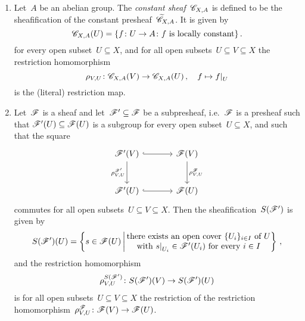 \begin{example}
\begin{enumerate}
      \begin{examplenonum}[Sheafificaton]
        \leavevmode
        \begin{enumerate}
          \item
            Let~$A$ be an abelian group.
            The \emph{constant sheaf}~$\mathscr{C}_{X,A}$ is defined to be the sheafification of the constant presheaf~$\widetilde{\mathscr{C}}_{X,A}$.
            It is given by
            \[
                \mathscr{C}_{X,A}(U)
              = \{
                  f \colon U \to A
                \colon
                  \text{$f$ is locally constant}
                \} \,.
            \]
            for every open subset~$U \subseteq X$, and for all open subsets~$U \subseteq V \subseteq X$ the restriction homomorphism
            \[
                      \rho_{V,U}
              \colon  \Cs_{X,A}(V)
              \to     \Cs_{X,A}(U) \,,
              \quad   f
              \mapsto \restrict{f}{U}
            \]
            is the (literal) restriction map.
          \item
            Let~$\mathscr{F}$ is a sheaf and let~$\mathscr{F}' \subseteq \mathscr{F}$ be a subpresheaf, i.e.~$\mathscr{F}$ is a presheaf such that $\mathscr{F}'(U) \subseteq \mathscr{F}(U)$ is a subgroup for every open subset~$U \subseteq X$, and such that the square
            \[
              \begin{tikzcd}[sep = large]
                  \Fs'(V)
                  \arrow[hook]{r}
                  \arrow{d}[left]{\rho^{\Fs'}_{V,U}}
                & \Fs(V)
                  \arrow{d}[right]{\rho^\Fs_{V,U}}
                \\
                  \Fs'(U)
                  \arrow[hook]{r}
                & \Fs(U)
              \end{tikzcd}
            \]
            commutes for all open subsets~$U \subseteq V \subseteq X$.
            Then the sheafification~$S(\mathscr{F}')$ is given by
            \[
                S(\Fs')(U)
              = \left\{
                  s \in \Fs(U)
                \suchthat*
                  \begin{tabular}{@{}c@{}}
                    there exists an open cover~$\{U_i\}_{i \in I}$ of~$U$ \\
                    with~$\restrict{s}{U_i} \in \Fs'(U_i)$ for every~$i\in I$
                  \end{tabular}
                \right\} \,,
            \]
            and the restriction homomorphism
            \[
                      \rho_{V,U}^{S(\mathscr{F}')}
              \colon  S(\mathscr{F}')(V)
              \to     S(\mathscr{F}')(U)
            \]
            is for all open subsets~$U \subseteq V \subseteq X$ the restriction of the restriction homomorphism~$\rho_{V,U}^{\mathscr{F}} \colon \mathscr{F}(V) \to \mathscr{F}(U)$.
        \end{enumerate}
      \end{examplenonum}
      

\end{enumerate}
\end{example}
